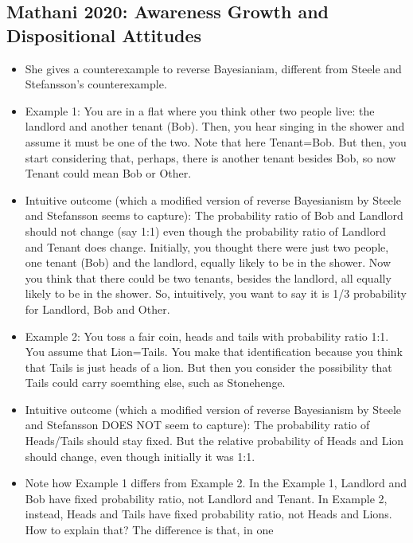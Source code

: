 \documentclass[
  11pt,
  dvipsnames,enabledeprecatedfontcommands]{scrartcl}
\begin{document}
\hypertarget{mathani-2020-awareness-growth-and-dispositional-attitudes}{%
\subsection{Mathani 2020: Awareness Growth and Dispositional
Attitudes}\label{mathani-2020-awareness-growth-and-dispositional-attitudes}}

\begin{itemize}
\item
  She gives a counterexample to reverse Bayesianiam, different from
  Steele and Stefansson's counterexample.
\item
  Example 1: You are in a flat where you think other two people live:
  the landlord and another tenant (Bob). Then, you hear singing in the
  shower and assume it must be one of the two. Note that here
  Tenant=Bob. But then, you start considering that, perhaps, there is
  another tenant besides Bob, so now Tenant could mean Bob or Other.
\item
  Intuitive outcome (which a modified version of reverse Bayesianism by
  Steele and Stefansson seems to capture): The probability ratio of Bob
  and Landlord should not change (say 1:1) even though the probability
  ratio of Landlord and Tenant does change. Initially, you thought there
  were just two people, one tenant (Bob) and the landlord, equally
  likely to be in the shower. Now you think that there could be two
  tenants, besides the landlord, all equally likely to be in the shower.
  So, intuitively, you want to say it is 1/3 probability for Landlord,
  Bob and Other.
\item
  Example 2: You toss a fair coin, heads and tails with probability
  ratio 1:1. You assume that Lion=Tails. You make that identification
  because you think that Tails is just heads of a lion. But then you
  consider the possibility that Tails could carry soemthing else, such
  as Stonehenge.
\item
  Intuitive outcome (which a modified version of reverse Bayesianism by
  Steele and Stefansson DOES NOT seem to capture): The probability ratio
  of Heads/Tails should stay fixed. But the relative probability of
  Heads and Lion should change, even though initially it was 1:1.
\item
  Note how Example 1 differs from Example 2. In the Example 1, Landlord
  and Bob have fixed probability ratio, not Landlord and Tenant. In
  Example 2, instead, Heads and Tails have fixed probability ratio, not
  Heads and Lions. How to explain that? The difference is that, in one

\end{itemize}
\end{document}

